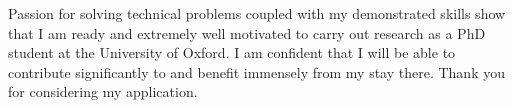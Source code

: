 \documentclass[12pt]{article}
\begin{document}
Passion for solving technical problems coupled with my demonstrated skills show that I am ready and extremely well motivated to carry out research as a PhD student at the University of Oxford. I am confident that I will be able to contribute significantly to and benefit immensely from my stay there. Thank you for considering my application.
\end{document}
